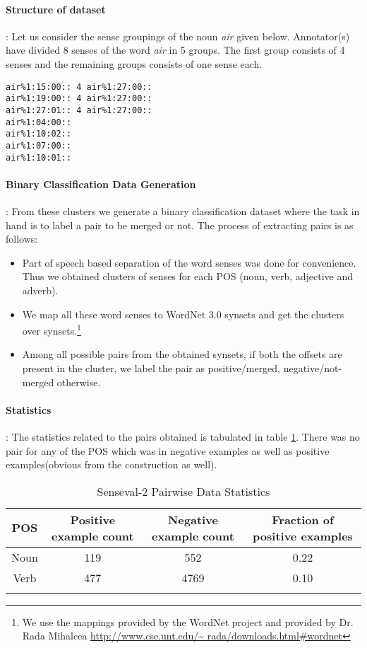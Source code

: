 \paragraph{Structure of dataset}: Let us consider the sense groupings of the noun \textit{air} given below. Annotator(s) have divided 8 senses of the word \textit{air} in 5 groups. The first group consists of 4 senses and the remaining groups consists of one sense each.

\begin{verbatim}
air%1:15:00:: 4 air%1:27:00::
air%1:19:00:: 4 air%1:27:00::
air%1:27:01:: 4 air%1:27:00::
air%1:04:00::
air%1:10:02::
air%1:07:00::
air%1:10:01::
\end{verbatim}

\paragraph{Binary Classification Data Generation}: From these clusters we generate a binary classification dataset where the task in hand is to label a pair to be merged or not. 
The process of extracting pairs is as follows: 
\begin{itemize}
\item Part of speech based separation of the word senses was done for convenience. Thus we obtained clusters of senses for each POS (noun, verb, adjective and adverb).
\item We map all these word senses to WordNet 3.0 synsets and get the clusters over synsets.\footnote{We use the mappings provided by the WordNet project and provided by Dr. Rada Mihalcea \url{http://www.cse.unt.edu/~ rada/downloads.html\#wordnet}}
\item Among all possible pairs from the obtained synsets, if both the offsets are present in the cluster, we label the pair as positive/merged, negative/not-merged otherwise.
\end{itemize}

\paragraph{Statistics}: 
The statistics related to the pairs obtained is tabulated in table \ref{tab:senseval2stats}. There was no pair for any of the POS which was in negative examples as well as positive examples(obvious from the construction as well).

\begin{center}
\begin{longtable}{| c | c | c | c |}  
\hline
POS & Positive example count & Negative example count & Fraction of positive examples \\ \hline
Noun & 119 & 552 & 0.22 \\ \hline
Verb & 477 & 4769 & 0.10 \\ \hline
\caption{Senseval-2 Pairwise Data Statistics}
\label{tab:senseval2stats}
\end{longtable}
\end{center}


